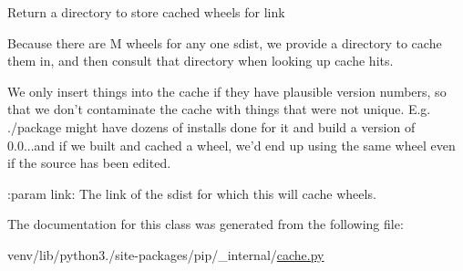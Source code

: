 \begin{DoxyVerb}Return a directory to store cached wheels for link

Because there are M wheels for any one sdist, we provide a directory
to cache them in, and then consult that directory when looking up
cache hits.

We only insert things into the cache if they have plausible version
numbers, so that we don't contaminate the cache with things that were
not unique. E.g. ./package might have dozens of installs done for it
and build a version of 0.0...and if we built and cached a wheel, we'd
end up using the same wheel even if the source has been edited.

:param link: The link of the sdist for which this will cache wheels.
\end{DoxyVerb}
 

The documentation for this class was generated from the following file\+:\begin{DoxyCompactItemize}
\item 
venv/lib/python3./site-\/packages/pip/\+\_\+internal/\hyperlink{__internal_2cache_8py}{cache.\+py}\end{DoxyCompactItemize}
